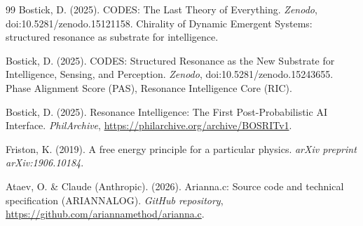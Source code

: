 \documentclass[11pt,a4paper]{article}
\begin{document}
\begin{thebibliography}{99}
Bostick, D. (2025).
CODES: The Last Theory of Everything.
\textit{Zenodo}, doi:10.5281/zenodo.15121158.
Chirality of Dynamic Emergent Systems: structured resonance as substrate for intelligence.

Bostick, D. (2025).
CODES: Structured Resonance as the New Substrate for Intelligence, Sensing, and Perception.
\textit{Zenodo}, doi:10.5281/zenodo.15243655.
Phase Alignment Score (PAS), Resonance Intelligence Core (RIC).

Bostick, D. (2025).
Resonance Intelligence: The First Post-Probabilistic AI Interface.
\textit{PhilArchive}, \url{https://philarchive.org/archive/BOSRITv1}.

Friston, K. (2019).
A free energy principle for a particular physics.
\textit{arXiv preprint arXiv:1906.10184}.

Ataev, O. \& Claude (Anthropic). (2026).
Arianna.c: Source code and technical specification (ARIANNALOG).
\textit{GitHub repository}, \url{https://github.com/ariannamethod/arianna.c}.

\end{thebibliography}
\end{document}
